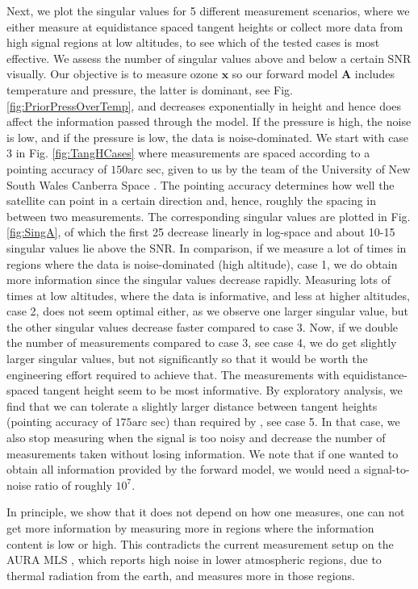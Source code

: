 Next, we plot the singular values for 5 different measurement scenarios, where we either measure at equidistance spaced tangent heights or collect more data from high signal regions at low altitudes, to see which of the tested cases is most effective.
We assess the number of singular values above and below a certain SNR visually.
Our objective is to measure ozone $\bm{x}$ so our forward model $\bm{A}$ includes temperature and pressure, the latter is dominant, see Fig. \ref{fig:PriorPressOverTemp}, and decreases exponentially in height and hence does affect the information passed through the model.
If the pressure is high, the noise is low, and if the pressure is low, the data is noise-dominated.
We start with case 3 in Fig. \ref{fig:TangHCases} where measurements are spaced according to a pointing accuracy of $150\text{arc sec}$, given to us by the team of the University of New South Wales Canberra Space \cite{CubeSatInternal}.
The pointing accuracy determines how well the satellite can point in a certain direction and, hence, roughly the spacing in between two measurements.
The corresponding singular values are plotted in Fig. \ref{fig:SingA}, of which the first 25 decrease linearly in log-space and about 10-15 singular values lie above the SNR.
In comparison, if we measure a lot of times in regions where the data is noise-dominated (high altitude), case 1, we do obtain more information since the singular values decrease rapidly.
Measuring lots of times at low altitudes, where the data is informative, and less at higher altitudes, case 2, does not seem optimal either, as we observe one larger singular value, but the other singular values decrease faster compared to case 3.
Now, if we double the number of measurements compared to case 3, see case 4, we do get slightly larger singular values, but not significantly so that it would be worth the engineering effort required to achieve that.
The measurements with equidistance-spaced tangent height seem to be most informative.
By exploratory analysis, we find that we can tolerate a slightly larger distance between tangent heights (pointing accuracy of $175\text{arc sec}$) than required by \cite{CubeSatInternal}, see case 5.
In that case, we also stop measuring when the signal is too noisy and decrease the number of measurements taken without losing information.
We note that if one wanted to obtain all information provided by the forward model, we would need a signal-to-noise ratio of roughly $10^7$.

In principle, we show that it does not depend on how one measures, one can not get more information by measuring more in regions where the information content is low or high.
This contradicts the current measurement setup on the AURA MLS  \cite{livesey2006retrieval}, which reports high noise in lower atmospheric regions, due to thermal radiation from the earth, and measures more in those regions.



